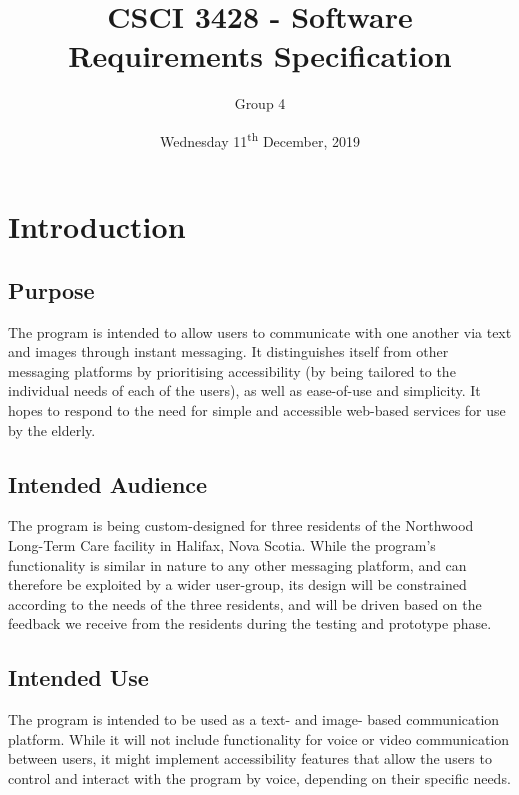 \documentclass[11pt]{article}
\renewcommand{\headrulewidth}{.3pt}
\renewcommand{\footrulewidth}{.3pt}
\begin{document}
\title{CSCI 3428 - Software Requirements Specification}
\author{Group 4}
\date{Wednesday 11\textsuperscript{th} December, 2019}
\maketitle

\fancypagestyle{plain}{
\fancyhf{} %
\fancyfoot[r]{\footnotesize \thepage} %
\fancyfoot[l]{\small\scshape SRS} %
\renewcommand{\headrulewidth}{0pt}
\renewcommand{\footrulewidth}{.3pt}}

\section{Introduction}
\subsection{Purpose}
The program is intended to allow users to communicate with one another via text and images through
instant messaging. It distinguishes itself from other messaging platforms by prioritising
accessibility (by being tailored to the individual needs of each of the users), as well as
ease-of-use and simplicity. It hopes to respond to the need for simple and accessible web-based
services for use by the elderly.

\subsection{Intended Audience}
The program is being custom-designed for three residents of the Northwood Long-Term Care
facility in Halifax, Nova Scotia. While the program's functionality is similar in nature to any
other messaging platform, and can therefore be exploited by a wider user-group, its design will be
constrained according to the needs of the three residents, and will be driven based on the feedback
we receive from the residents during the testing and prototype phase.

\subsection{Intended Use}
The program is intended to be used as a text- and image- based communication platform. While it will not
include functionality for voice or video communication between users, it might implement
accessibility features that allow the users to control and interact with the program by voice,
depending on their specific needs.
\end{document}

